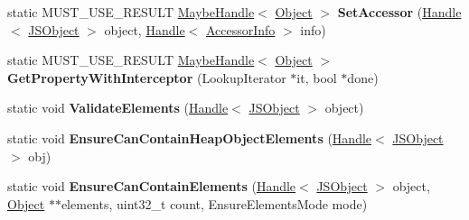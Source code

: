 \begin{DoxyCompactItemize}
\item 
static M\+U\+S\+T\+\_\+\+U\+S\+E\+\_\+\+R\+E\+S\+U\+LT \hyperlink{classv8_1_1internal_1_1_maybe_handle}{Maybe\+Handle}$<$ \hyperlink{classv8_1_1internal_1_1_object}{Object} $>$ {\bfseries Set\+Accessor} (\hyperlink{classv8_1_1internal_1_1_handle}{Handle}$<$ \hyperlink{classv8_1_1internal_1_1_j_s_object}{J\+S\+Object} $>$ object, \hyperlink{classv8_1_1internal_1_1_handle}{Handle}$<$ \hyperlink{classv8_1_1internal_1_1_accessor_info}{Accessor\+Info} $>$ info)\hypertarget{classv8_1_1internal_1_1_j_s_object_a235f7259f408a3c9464e0959bc14480d}{}\label{classv8_1_1internal_1_1_j_s_object_a235f7259f408a3c9464e0959bc14480d}

\item 
static M\+U\+S\+T\+\_\+\+U\+S\+E\+\_\+\+R\+E\+S\+U\+LT \hyperlink{classv8_1_1internal_1_1_maybe_handle}{Maybe\+Handle}$<$ \hyperlink{classv8_1_1internal_1_1_object}{Object} $>$ {\bfseries Get\+Property\+With\+Interceptor} (Lookup\+Iterator $\ast$it, bool $\ast$done)\hypertarget{classv8_1_1internal_1_1_j_s_object_a9c273ee11c01281f813ae34589bf33a9}{}\label{classv8_1_1internal_1_1_j_s_object_a9c273ee11c01281f813ae34589bf33a9}

\item 
static void {\bfseries Validate\+Elements} (\hyperlink{classv8_1_1internal_1_1_handle}{Handle}$<$ \hyperlink{classv8_1_1internal_1_1_j_s_object}{J\+S\+Object} $>$ object)\hypertarget{classv8_1_1internal_1_1_j_s_object_abdb09e647ccb020a4e75eda86d7c1893}{}\label{classv8_1_1internal_1_1_j_s_object_abdb09e647ccb020a4e75eda86d7c1893}

\item 
static void {\bfseries Ensure\+Can\+Contain\+Heap\+Object\+Elements} (\hyperlink{classv8_1_1internal_1_1_handle}{Handle}$<$ \hyperlink{classv8_1_1internal_1_1_j_s_object}{J\+S\+Object} $>$ obj)\hypertarget{classv8_1_1internal_1_1_j_s_object_a341090eaa5e24dd4bbecd049e44d72ef}{}\label{classv8_1_1internal_1_1_j_s_object_a341090eaa5e24dd4bbecd049e44d72ef}

\item 
static void {\bfseries Ensure\+Can\+Contain\+Elements} (\hyperlink{classv8_1_1internal_1_1_handle}{Handle}$<$ \hyperlink{classv8_1_1internal_1_1_j_s_object}{J\+S\+Object} $>$ object, \hyperlink{classv8_1_1internal_1_1_object}{Object} $\ast$$\ast$elements, uint32\+\_\+t count, Ensure\+Elements\+Mode mode)\hypertarget{classv8_1_1internal_1_1_j_s_object_abfa1be1a1e484b51bc3b4f598a95da3f}{}\label{classv8_1_1internal_1_1_j_s_object_abfa1be1a1e484b51bc3b4f598a95da3f}


\end{DoxyCompactItemize}

